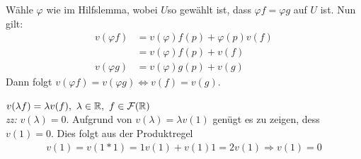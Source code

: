 \begin{bew}[zu 2]
Wähle $\varphi$ wie im Hilfslemma, wobei $U$so gewählt ist, dass $\varphi f = \varphi g$ auf $U$ ist. Nun gilt:
\begin{align*}
v(\varphi f) &= v(\varphi)f(p) + \varphi(p)v(f)\\
&= v(\varphi)f(p) + v(f)\\
v(\varphi g) &= v(\varphi)g(p) + v(g)
\end{align*}
Dann folgt $v(\varphi f) = v(\varphi g) \Leftrightarrow v(f) = v(g)$.
\end{bew}

\begin{bew}[zu 1]
	$v(\lambda f) = \lambda v(f),\ \lambda \in \mathbb{R},\ f\in \mathcal{F}(\mathbb{R})$\\
	\textit{zz:} $v(\lambda) = 0$. Aufgrund von $v(\lambda) = \lambda v(1)$ genügt es zu zeigen, dess $v(1) = 0$. Dies folgt aus der Produktregel
	\begin{align*}
	v(1) = v(1*1) = 1v(1) + v(1)1 = 2v(1) \Rightarrow v(1) = 0
	\end{align*}
\end{bew}

